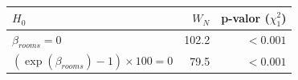 
\begin{tabular}{lrr}
\toprule
$H_0$ & $W_N$ & p-valor ($\chi^2_1$)\\
\midrule
$\beta_{rooms}=0$ & 102.2 & $<0.001$\\
$(\exp(\beta_{rooms})-1)\times 100=0$ & 79.5 & $<0.001$\\
\bottomrule
\end{tabular}

